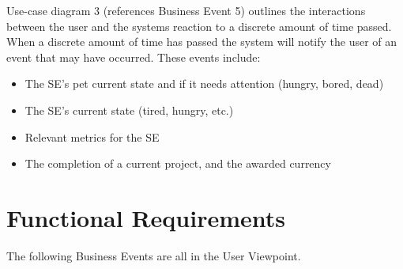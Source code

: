 \documentclass[]{article}
\begin{document}
Use-case diagram 3 (references Business Event 5) outlines the interactions 
between the user and the systems reaction to a discrete amount of time passed. 
When a discrete amount of time has passed the system will notify the user of an 
event that may have occurred. These events include:

\begin{itemize}
    \item The SE’s pet current state and if it needs attention (hungry, bored, 
    dead)
    \item The SE’s current state (tired, hungry, etc.)
    \item Relevant metrics for the SE
    \item The completion of a current project, and the awarded currency
\end{itemize}

\section{Functional Requirements}
\label{sec:functional_requirements}
The following Business Events are all in the User Viewpoint.
\end{document}
